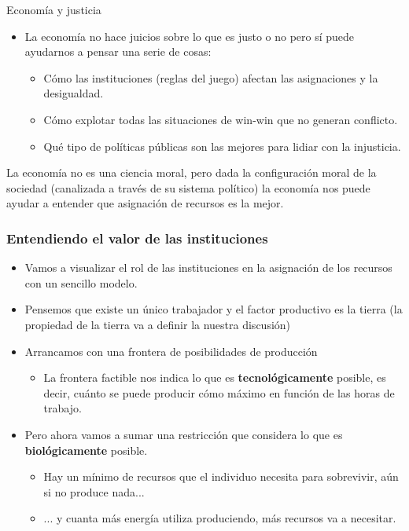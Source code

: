 \documentclass{beamer}
\begin{document}
\begin{frame}{Economía y justicia}
    \begin{itemize}
        \item La economía no hace juicios sobre lo que es justo o no pero sí puede ayudarnos a pensar una serie de cosas:
        \begin{itemize}
            \item Cómo las instituciones (reglas del juego) afectan las asignaciones y la desigualdad.
            \item Cómo explotar todas las situaciones de win-win que no generan conflicto.
            \item Qué tipo de políticas públicas son las mejores para lidiar con la injusticia.
        \end{itemize}
    \end{itemize}
    \begin{boxA}
        La economía no es una ciencia moral, pero dada la configuración moral de la sociedad (canalizada a través de su sistema político) la economía nos puede ayudar a entender que asignación de recursos es la mejor.
    \end{boxA}
\end{frame}


\begin{frame}
\frametitle{Entendiendo el valor de las instituciones}
\begin{itemize}
    \item Vamos a visualizar el rol de las instituciones en la asignación de los recursos con un sencillo modelo. 
    \item Pensemos que existe un único trabajador y el factor productivo es la tierra (la propiedad de la tierra va a definir la nuestra discusión)
    \item Arrancamos con una frontera de posibilidades de producción 
        \begin{itemize}
        \item La frontera factible nos indica lo que es \textbf{tecnológicamente} posible, es decir, cuánto se puede producir cómo máximo en función de las horas de trabajo.
        \end{itemize}
    \item Pero ahora vamos a sumar una restricción que considera lo que es \textbf{biológicamente} posible.
        \begin{itemize} 
            \item Hay un mínimo de recursos que el individuo necesita para sobrevivir, aún si no produce nada...
            \item  ... y cuanta más energía utiliza produciendo, más recursos va a necesitar.
        \end{itemize}
    \end{itemize}
\end{frame}
\end{document}
